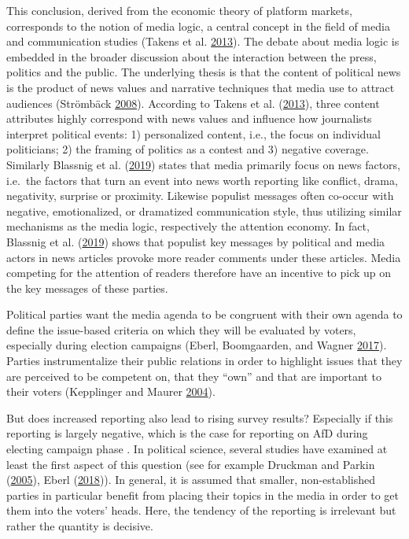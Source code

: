 \documentclass[
]{article}
\begin{document}
This conclusion, derived from the economic theory of platform markets,
corresponds to the notion of media logic, a central concept in the field
of media and communication studies (Takens et al.
\protect\hyperlink{ref-takens_media_2013}{2013}). The debate about media
logic is embedded in the broader discussion about the interaction
between the press, politics and the public. The underlying thesis is
that the content of political news is the product of news values and
narrative techniques that media use to attract audiences (Strömbäck
\protect\hyperlink{ref-stromback_four_2008}{2008}). According to Takens
et al. (\protect\hyperlink{ref-takens_media_2013}{2013}), three content
attributes highly correspond with news values and influence how
journalists interpret political events: 1) personalized content, i.e.,
the focus on individual politicians; 2) the framing of politics as a
contest and 3) negative coverage. Similarly Blassnig et al.
(\protect\hyperlink{ref-blassnig_hitting_2019}{2019}) states that media
primarily focus on news factors, i.e.~the factors that turn an event
into news worth reporting like conflict, drama, negativity, surprise or
proximity. Likewise populist messages often co-occur with negative,
emotionalized, or dramatized communication style, thus utilizing similar
mechanisms as the media logic, respectively the attention economy. In
fact, Blassnig et al.
(\protect\hyperlink{ref-blassnig_hitting_2019}{2019}) shows that
populist key messages by political and media actors in news articles
provoke more reader comments under these articles. Media competing for
the attention of readers therefore have an incentive to pick up on the
key messages of these parties.

Political parties want the media agenda to be congruent with their own
agenda to define the issue-based criteria on which they will be
evaluated by voters, especially during election campaigns (Eberl,
Boomgaarden, and Wagner \protect\hyperlink{ref-eberl_one_2017}{2017}).
Parties instrumentalize their public relations in order to highlight
issues that they are perceived to be competent on, that they ``own'' and
that are important to their voters (Kepplinger and Maurer
\protect\hyperlink{ref-kepplinger_einfluss_2004}{2004}).

But does increased reporting also lead to rising survey results?
Especially if this reporting is largely negative, which is the case for
reporting on AfD during electing campaign phase . In political science,
several studies have examined at least the first aspect of this question
(see for example Druckman and Parkin
(\protect\hyperlink{ref-druckman_impact_2005}{2005}), Eberl
(\protect\hyperlink{ref-eberl_lying_2018}{2018})). In general, it is
assumed that smaller, non-established parties in particular benefit from
placing their topics in the media in order to get them into the voters'
heads. Here, the tendency of the reporting is irrelevant but rather the
quantity is decisive.
\end{document}

